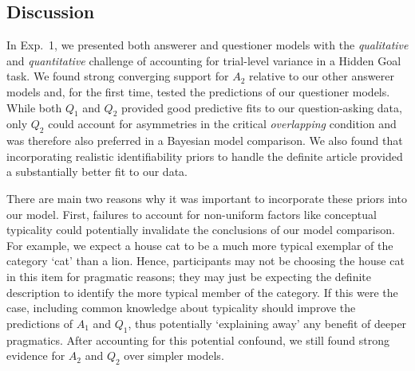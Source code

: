 \documentclass[11pt, floatsintext]{apa6}
\begin{document}


\subsection{Discussion}

In Exp.~1, we presented both answerer and questioner models with the  \emph{qualitative} and \emph{quantitative} challenge of accounting for trial-level variance in a Hidden Goal task. 
We found strong converging support for $A_2$ relative to our other answerer models and, for the first time, tested the predictions of our questioner models. 
While both $Q_1$ and $Q_2$ provided good predictive fits to our question-asking data, only $Q_2$ could account for asymmetries in the critical \emph{overlapping} condition and was therefore also preferred in a Bayesian model comparison. 
We also found that incorporating realistic identifiability priors to handle the definite article provided a substantially better fit to our data. 

There are main two reasons why it was important to incorporate these priors into our model.
First, failures to account for non-uniform factors like conceptual typicality could potentially invalidate the conclusions of our model comparison. 
For example, we expect a house cat to be a much more typical exemplar of the category `cat' than a lion. 
Hence, participants may not be choosing the house cat in this item for pragmatic reasons; they may just be expecting the definite description to identify the more typical member of the category. 
If this were the case, including common knowledge about typicality should improve the predictions of $A_1$ and $Q_1$, thus potentially `explaining away' any benefit of deeper pragmatics. 
After accounting for this potential confound, we still found strong evidence for $A_2$ and $Q_2$ over simpler models.
\end{document}
